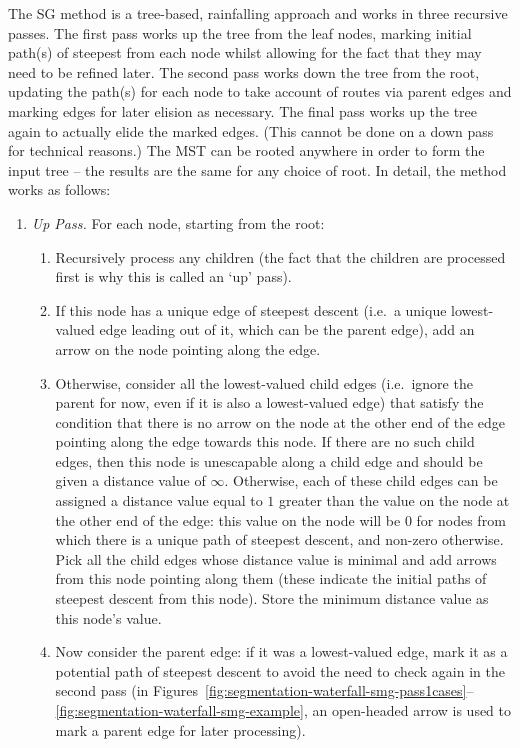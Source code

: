 \documentclass[a4paper]{article}
\begin{document}
The SG method is a tree-based, rainfalling approach and works in three recursive passes. The first pass works up the tree from the leaf nodes, marking initial path(s) of steepest from each node whilst allowing for the fact that they may need to be refined later. The second pass works down the tree from the root, updating the path(s) for each node to take account of routes via parent edges and marking edges for later elision as necessary. The final pass works up the tree again to actually elide the marked edges. (This cannot be done on a down pass for technical reasons.) The MST can be rooted anywhere in order to form the input tree -- the results are the same for any choice of root. In detail, the method works as follows:
%
\begin{enumerate}

\item \emph{Up Pass.} For each node, starting from the root:

\begin{enumerate}
\item Recursively process any children (the fact that the children are processed first is why this is called an `up' pass).
\item If this node has a unique edge of steepest descent (i.e.~a unique lowest-valued edge leading out of it, which can be the parent edge), add an arrow on the node pointing along the edge.
\item Otherwise, consider all the lowest-valued child edges (i.e.~ignore the parent for now, even if it is also a lowest-valued edge) that satisfy the condition that there is no arrow on the node at the other end of the edge pointing along the edge towards this node. If there are no such child edges, then this node is unescapable along a child edge and should be given a distance value of $\infty$. Otherwise, each of these child edges can be assigned a distance value equal to $1$ greater than the value on the node at the other end of the edge: this value on the node will be $0$ for nodes from which there is a unique path of steepest descent, and non-zero otherwise. Pick all the child edges whose distance value is minimal and add arrows from this node pointing along them (these indicate the initial paths of steepest descent from this node). Store the minimum distance value as this node's value.
\item Now consider the parent edge: if it was a lowest-valued edge, mark it as a potential path of steepest descent to avoid the need to check again in the second pass (in Figures~\ref{fig:segmentation-waterfall-smg-pass1cases}--\ref{fig:segmentation-waterfall-smg-example}, an open-headed arrow is used to mark a parent edge for later processing).
\end{enumerate}


\end{enumerate}
\end{document}
